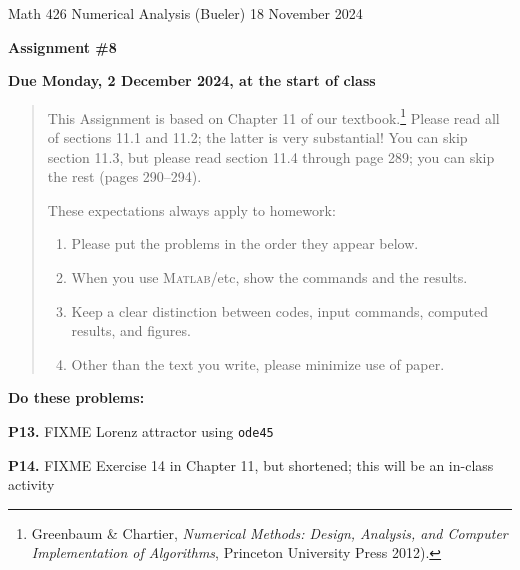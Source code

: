 \documentclass[12pt]{amsart}
\newcommand{\Matlab}{\textsc{Matlab}\xspace}
\newcommand{\prob}[1]{\bigskip\noindent\textbf{#1.}\quad }
\begin{document}
\scriptsize \noindent Math 426 Numerical Analysis (Bueler) \hfill 18 November 2024
\normalsize

\medskip\bigskip

\Large\centerline{\textbf{Assignment \#8}}
\large
\bigskip

\centerline{\textbf{Due Monday, 2 December 2024, at the start of class}}
\medskip
\normalsize

\thispagestyle{empty}

\begin{quote}
{\small
This Assignment is based on Chapter 11 of our textbook.\footnote{Greenbaum \& Chartier, \emph{Numerical Methods: Design, Analysis, and Computer Implementation of Algorithms}, Princeton University Press 2012).}  Please read all of sections 11.1 and 11.2; the latter is very substantial!  You can skip section 11.3, but please read section 11.4 through page 289; you can skip the rest (pages 290--294).

\medskip
\noindent These expectations always apply to homework:
\renewcommand{\labelenumi}{\arabic{enumi}.\,}
\begin{enumerate}
\item Please put the problems in the order they appear below.
\item When you use \Matlab/etc, show the commands and the results.
\item Keep a clear distinction between codes, input commands, computed results, and figures.
\item Other than the text you write, please minimize use of paper.
\end{enumerate}
}
\end{quote}

\medskip
\noindent \textbf{Do these problems:}


\prob{P13} FIXME Lorenz attractor using \texttt{ode45}


\prob{P14} FIXME Exercise 14 in Chapter 11, but shortened; this will be an in-class activity
\end{document}
